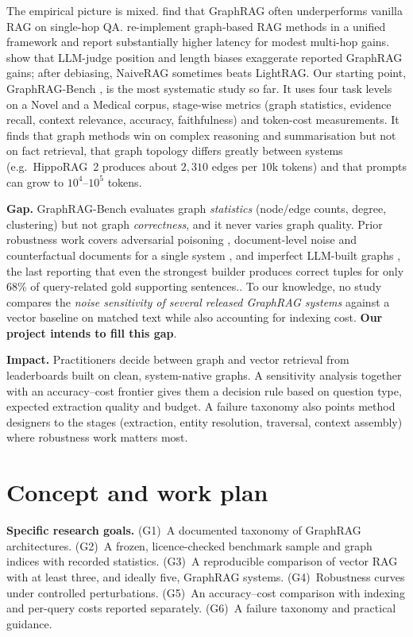 \documentclass[11pt]{article}
\begin{document}
The empirical picture is mixed.  find that GraphRAG often underperforms vanilla RAG on single-hop QA.  re-implement graph-based RAG methods in a unified framework and report substantially higher latency for modest multi-hop gains.  show that LLM-judge position and length biases exaggerate reported GraphRAG gains; after debiasing, NaiveRAG sometimes beats LightRAG. Our starting point, GraphRAG-Bench \cite{xiang2026when}, is the most systematic study so far. It uses four task levels on a Novel and a Medical corpus, stage-wise metrics (graph statistics, evidence recall, context relevance, accuracy, faithfulness) and token-cost measurements. It finds that graph methods win on complex reasoning and summarisation but not on fact retrieval, that graph topology differs greatly between systems (e.g.\ HippoRAG~2 produces about $2{,}310$ edges per $10$k tokens) and that prompts can grow to $10^4$--$10^5$ tokens.

\textbf{Gap.} GraphRAG-Bench evaluates graph \emph{statistics} (node/edge counts, degree, clustering) but not graph \emph{correctness}, and it never varies graph quality. Prior robustness work covers adversarial poisoning \cite{liang2025underfire}, document-level noise and counterfactual documents for a single system \cite{amamou2026robust}, and imperfect LLM-built graphs \cite{ma2026robustgraphrag}, the last reporting that even the strongest builder produces correct tuples for only 68\% of query-related gold supporting sentences.. To our knowledge, no study compares the \emph{noise sensitivity of several released GraphRAG systems} against a vector baseline on matched text while also accounting for indexing cost. \textbf{Our project intends to fill this gap}.

\textbf{Impact.} Practitioners decide between graph and vector retrieval from leaderboards built on clean, system-native graphs. A sensitivity analysis together with an accuracy--cost frontier gives them a decision rule based on question type, expected extraction quality and budget. A failure taxonomy also points method designers to the stages (extraction, entity resolution, traversal, context assembly) where robustness work matters most.

\section{Concept and work plan}
\label{sec:plan}

\textbf{Specific research goals.} (G1)~A documented taxonomy of GraphRAG architectures. (G2)~A frozen, licence-checked benchmark sample and graph indices with recorded statistics. (G3)~A reproducible comparison of vector RAG with at least three, and ideally five, GraphRAG systems. (G4)~Robustness curves under controlled perturbations. (G5)~An accuracy--cost comparison with indexing and per-query costs reported separately. (G6)~A failure taxonomy and practical guidance.
\end{document}
